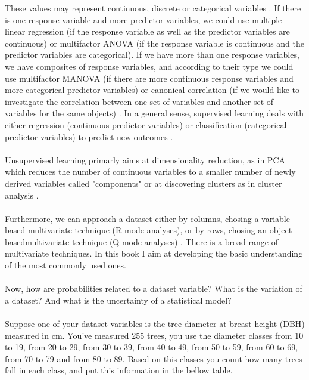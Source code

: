 \documentclass {article}
\begin{document}
 These values may represent continuous, discrete or categorical variables \cite{carroll_mathematical_1997}.
 If there is one response variable and more predictor variables, we could use multiple linear regression (if the response variable as well as the predictor variables are continuous) or multifactor ANOVA (if the response variable is continuous and the predictor variables are categorical).
 If we have more than one response variables, we have composites of response variables, and according to their type we could use multifactor MANOVA (if there are more continuous response variables and more categorical predictor variables) or canonical correlation (if we would like to investigate the correlation between one set of variables and another set of variables for the same objects) \cite{quinn_experimental_2002} \cite{murphy_machine_2012}. In a general sense, supervised learning deals with either regression (continuous predictor variables) or classification (categorical predictor variables) to predict new outcomes \cite{murphy_machine_2012}.   
\\
\\
Unsupervised learning primarly aims at dimensionality reduction, as in PCA which reduces the number of continuous variables to a smaller number of newly derived variables called "components" or at discovering clusters as in cluster analysis\cite{carroll_mathematical_1997} \cite{quinn_experimental_2002} \cite{murphy_machine_2012}. 
\\
\\ 
Furthermore, we can approach a dataset either by columns, chosing a variable-based multivariate technique (R-mode analyses), or by rows, chosing an object-basedmultivariate technique (Q-mode analyses) \cite{quinn_experimental_2002}.    
There is a broad range of multivariate techniques. In this book I aim at developing the basic understanding of the most commonly used ones. 
\\
\\
Now, how are probabilities related to a dataset variable? What is the variation of a dataset? And what is the uncertainty of a statistical model?
\\
\\
Suppose one of your dataset variables is the tree diameter at breast height (DBH) measured in cm. You've measured 255 trees, you use the diameter classes from 10 to 19, from 20 to 29, from 30 to 39, from 40 to 49, from 50 to 59, from 60 to 69, from 70 to 79 and from 80 to 89. Based on this classes you count how many trees fall in each class, and put this information in the bellow table.
\end{document}
